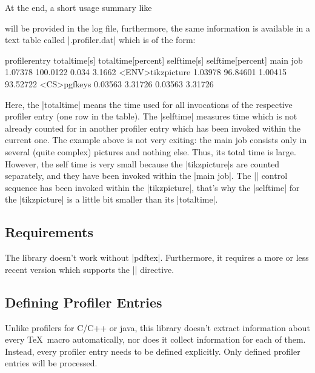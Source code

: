 At the end, a short usage summary like
\noindent will be provided in the log file, furthermore, the same information is available in a text table called |\jobname.profiler.dat| which is of the form:
\begin{codeexample}
profilerentry       totaltime[s]        totaltime[percent]  selftime[s]         selftime[percent]   
main job            1.07378             100.0122            0.034               3.1662              
<ENV>tikzpicture    1.03978             96.84601            1.00415             93.52722            
<CS>pgfkeys         0.03563             3.31726             0.03563             3.31726             
\end{codeexample}
Here, the |totaltime| means the time used for all invocations of the respective profiler entry (one row in the table). The |selftime| measures time which is not already counted for in another profiler entry which has been invoked within the current one. The example above is not very exiting: the main job consists only in several (quite complex) pictures and nothing else. Thus, its total time is large. However, the self time is very small because the |tikzpicture|s are counted separately, and they have been invoked within the |main job|. The |\pgfkeys| control sequence has been invoked within the |tikzpicture|, that's why the |selftime| for the |tikzpicture| is a little bit smaller than its |totaltime|.

\subsection{Requirements}
The library doesn't work without |pdftex|. Furthermore, it requires a more or less recent version which supports the |\pdfelapsedtime| directive.

\subsection{Defining Profiler Entries}
Unlike profilers for C/C++ or java, this library doesn't extract information about every \TeX\ macro automatically, nor does it collect information for each of them. Instead, every profiler entry needs to be defined explicitly. Only defined profiler entries will be processed.

